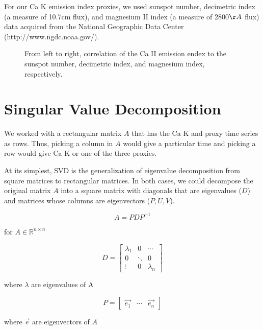 \documentclass[preprint2]{aastex}
\begin{document}
For our Ca K emission index proxies, we used sunspot number, decimetric index (a measure of 10.7cm flux), and magnesium II index (a measure of 2800$\AA$ flux) data acquired from the National Geographic Data Center (http://www.ngdc.noaa.gov/).


\begin{figure}[H]
\caption{From left to right, correlation of the Ca II emission endex to the sunspot number, decimetric index, and magnesium index, respectively.}
\end{figure}

\section{Singular Value Decomposition}

We worked with a rectangular matrix $A$ that has the Ca K and proxy time series as rows. Thus, picking a column in $A$ would give a particular time and picking a row would give Ca K or one of the three proxies.

At its simplest, SVD is the generalization of eigenvalue decomposition from square matrices to rectangular matrices. In both cases, we could decompose the original matrix $A$ into a square matrix with diagonals that are eigenvalues ($D$) and matrices whose columns are eigenvectors ($P, U, V$). 

\begin{equation} \label{eq:1}
A=PDP^{-1}
\end{equation}
\begin{center}
for $A \in \mathbb{R}^{n \times n}$
\end{center}

\begin{equation} \label{eq:2}
D=\left[\begin{array}{ccc}
\lambda_1 & 0 & \cdots \\
0 & \ddots & 0 \\
\vdots & 0 & \lambda_n
\end{array} \right]
\end{equation}
\begin{center}
where $\lambda$ are eigenvalues of A
\end{center}

\begin{equation} \label{eq:3}
P=\left[\begin{array}{ccc}
\vec{e_1} & \cdots & \vec{e_n}
\end{array} \right]
\end{equation}
\begin{center}
where $\vec{e}$ are eigenvectors of $A$ 
\end{center}
\end{document}
